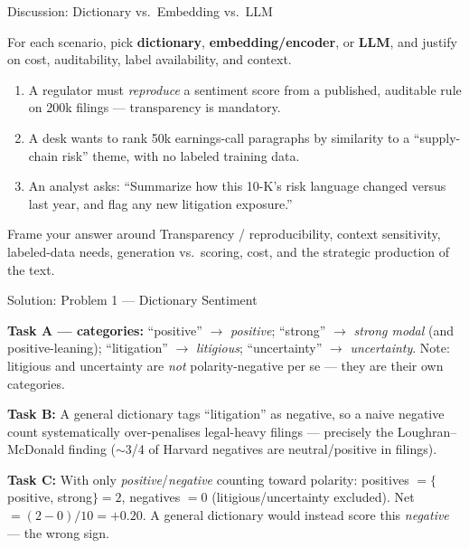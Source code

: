 \documentclass[9pt,t]{beamer}
\begin{document}
\begin{frame}{Discussion: Dictionary vs.\ Embedding vs.\ LLM}

For each scenario, pick \textbf{dictionary}, \textbf{embedding/encoder}, or
\textbf{LLM}, and justify on cost, auditability, label availability, and context.

\medskip
\begin{enumerate}
  \item A regulator must \emph{reproduce} a sentiment score from a published,
        auditable rule on 200k filings --- transparency is mandatory.
  \item A desk wants to rank 50k earnings-call paragraphs by similarity to a
        ``supply-chain risk'' theme, with no labeled training data.
  \item An analyst asks: ``Summarize how this 10-K's risk language changed
        versus last year, and flag any new litigation exposure.''
\end{enumerate}

\medskip
\begin{block}{Frame your answer around}
Transparency / reproducibility, context sensitivity, labeled-data needs,
generation vs.\ scoring, cost, and the strategic production of the text.
\end{block}
\end{frame}

\begin{frame}{Solution: Problem 1 --- Dictionary Sentiment}

\textbf{Task A --- categories:}
``positive'' $\to$ \emph{positive}; ``strong'' $\to$ \emph{strong modal} (and
positive-leaning); ``litigation'' $\to$ \emph{litigious}; ``uncertainty'' $\to$
\emph{uncertainty}. Note: litigious and uncertainty are \emph{not} polarity-negative
per se --- they are their own categories.

\medskip
\textbf{Task B:} A general dictionary tags ``litigation'' as negative, so a naive
negative count \alert{systematically over-penalises legal-heavy filings} ---
precisely the Loughran--McDonald finding ($\sim$3/4 of Harvard negatives are
neutral/positive in filings).

\medskip
\textbf{Task C:} With only \emph{positive}/\emph{negative} counting toward polarity:
positives $=\{$positive, strong$\}=2$, negatives $=0$ (litigious/uncertainty
excluded). Net $=(2-0)/10 = \mathbf{+0.20}$. A general dictionary would instead
score this \emph{negative} --- the wrong sign.
\end{frame}
\end{document}
